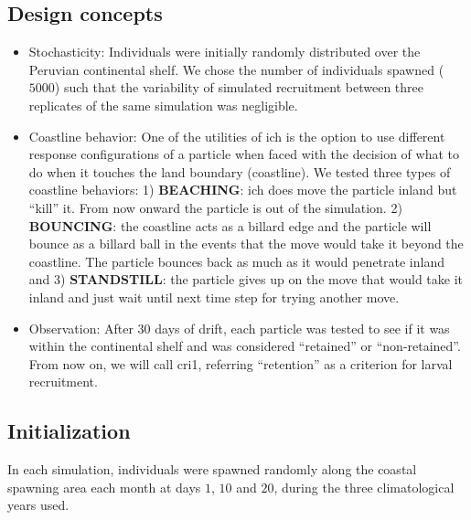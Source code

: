 \subsection{Design concepts}\label{Chap2MethDesi}

\begin{itemize}

\item Stochasticity: Individuals were initially randomly distributed over the Peruvian continental shelf. We chose the number of individuals spawned ($5000$) such that the variability of simulated recruitment between three replicates of the same simulation was negligible.\\

\item Coastline behavior: One of the utilities of \gls{ich} is the option to use different response configurations of a particle when faced with the decision of what to do when it touches the land boundary (coastline). We tested three types of coastline behaviors: 1) \textbf{BEACHING}: \gls{ich} does move the particle inland but ``kill'' it. From now onward the particle is out of the simulation. 2) \textbf{BOUNCING}: the coastline acts as a billard edge and the particle will bounce as a billard ball in the events that the move would take it beyond the coastline. The particle bounces back as much as it would penetrate inland and 3) \textbf{STANDSTILL}: the particle gives up on the move that would take it inland and just wait until next time step for trying another move.\\

\item Observation: After 30 days of drift, each particle was tested to see if it was within the continental shelf and was considered ``retained'' or ``non-retained''. From now on, we will call \gls{cri1}, referring ``retention'' as a criterion for larval recruitment.\\

\end{itemize}

\subsection{Initialization}\label{Chap2MethInit}

In each simulation, individuals were spawned randomly along the coastal spawning area each month at days $1$, $10$ and $20$, during the three climatological years used.\\


